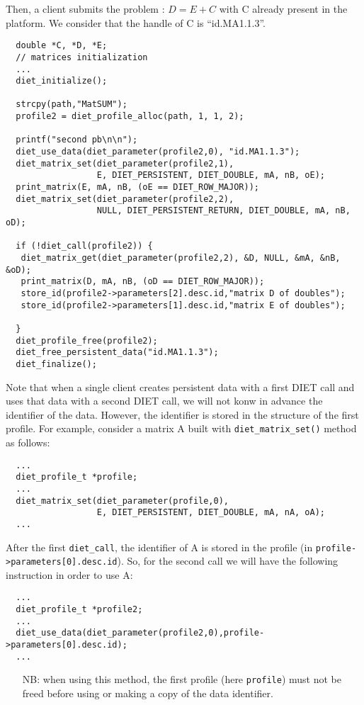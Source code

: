Then, a client submits the problem : $D=E+C$ with C already present
in the platform. We consider that the handle of C is ``id.MA1.1.3''.

{\footnotesize
\begin{verbatim}
  double *C, *D, *E; 
  // matrices initialization
  ...
  diet_initialize();

  strcpy(path,"MatSUM");
  profile2 = diet_profile_alloc(path, 1, 1, 2);
  
  printf("second pb\n\n");
  diet_use_data(diet_parameter(profile2,0), "id.MA1.1.3");
  diet_matrix_set(diet_parameter(profile2,1),
                  E, DIET_PERSISTENT, DIET_DOUBLE, mA, nB, oE);
  print_matrix(E, mA, nB, (oE == DIET_ROW_MAJOR));
  diet_matrix_set(diet_parameter(profile2,2),
                  NULL, DIET_PERSISTENT_RETURN, DIET_DOUBLE, mA, nB, oD);
  
  if (!diet_call(profile2)) {
   diet_matrix_get(diet_parameter(profile2,2), &D, NULL, &mA, &nB, &oD);
   print_matrix(D, mA, nB, (oD == DIET_ROW_MAJOR));
   store_id(profile2->parameters[2].desc.id,"matrix D of doubles");
   store_id(profile2->parameters[1].desc.id,"matrix E of doubles");
  
  }
  diet_profile_free(profile2);
  diet_free_persistent_data("id.MA1.1.3");
  diet_finalize();
\end{verbatim}
}  

Note that when a single client creates persistent data with a first
DIET call and uses that data with a second DIET call, we will not
konw in advance the identifier of the data.  However, the identifier 
is stored in the structure of the first profile. For example,
consider a matrix A built with
\texttt{diet\_matrix\_set()} method as follows: {\footnotesize
\begin{verbatim}
  ...
  diet_profile_t *profile;
  ...
  diet_matrix_set(diet_parameter(profile,0),
                  E, DIET_PERSISTENT, DIET_DOUBLE, mA, nA, oA);
  ...
\end{verbatim}
} After the first \texttt{diet\_call}, the identifier of A is stored in
the profile (in \texttt{profile->parameters[0].desc.id}). So, for the
second call we will have the following instruction in order to use A:
{\footnotesize
\begin{verbatim}
  ...
  diet_profile_t *profile2;
  ...
  diet_use_data(diet_parameter(profile2,0),profile->parameters[0].desc.id);
  ...
\end{verbatim}
}

\begin{itemize}
\item[NB:] when using this method, the first profile (here
\texttt{profile}) must not be freed before using or making a copy of
the data identifier.
\end{itemize}
